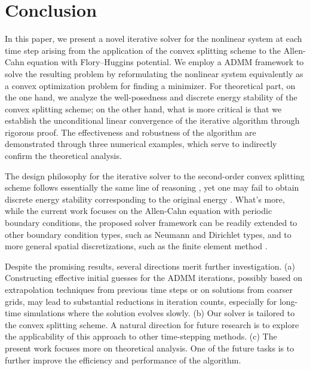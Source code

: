 \section{Conclusion}
\label{section:conclusion}
In this paper, we present a novel iterative solver for the nonlinear system at each time step arising from the application of the convex splitting scheme to the Allen-Cahn equation with Flory–Huggins potential. 
We employ a ADMM framework to solve the resulting problem 
by reformulating the nonlinear system equivalently as a convex optimization problem for finding a minimizer. 
For theoretical part, on the one hand, we analyze the well-posedness and discrete energy stability of the convex splitting scheme; 
on the other hand, what is more critical is that we establish the unconditional linear convergence of the iterative algorithm through rigorous proof.
The effectiveness and robustness of the algorithm are demonstrated through three numerical examples, 
which serve to indirectly confirm the theoretical analysis.
\par The design philosophy for the iterative solver to the second-order convex splitting scheme follows essentially the same line of reasoning \cite{li2025overcoming}, 
yet one may fail to obtain discrete energy stability corresponding to the original energy \cite{gomez2011provably,yang2016linear}. 
What's more, while the current work focuses on the Allen-Cahn equation with periodic boundary conditions, 
the proposed solver framework can be readily extended to other boundary condition types, such as Neumann and Dirichlet types, 
and to more general spatial discretizations, such as the finite element method \cite{yuan2022second}.
\par Despite the promising results, several directions merit further investigation. 
(a) Constructing effective initial guesses for the ADMM iterations, 
possibly based on extrapolation techniques from previous time steps or on solutions from coarser grids, 
may lead to substantial reductions in iteration counts, especially for long-time simulations where the solution evolves slowly.
(b) Our solver is tailored to the convex splitting scheme. 
A natural direction for future research is to explore the applicability of this approach to other time-stepping methods.
(c) The present work focuses more on theoretical analysis. 
One of the future tasks is to further improve the efficiency and performance of the algorithm.
